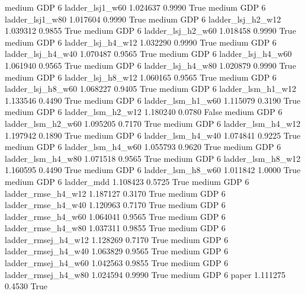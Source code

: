     medium      GDP                 6     ladder_lsj1_w60   1.024637      0.9990    True
    medium      GDP                 6     ladder_lsj1_w80   1.017604      0.9990    True
    medium      GDP                 6   ladder_lsj_h2_w12   1.039312      0.9855    True
    medium      GDP                 6   ladder_lsj_h2_w60   1.018458      0.9990    True
    medium      GDP                 6   ladder_lsj_h4_w12   1.032290      0.9990    True
    medium      GDP                 6   ladder_lsj_h4_w40   1.070487      0.9565    True
    medium      GDP                 6   ladder_lsj_h4_w60   1.061940      0.9565    True
    medium      GDP                 6   ladder_lsj_h4_w80   1.020879      0.9990    True
    medium      GDP                 6   ladder_lsj_h8_w12   1.060165      0.9565    True
    medium      GDP                 6   ladder_lsj_h8_w60   1.068227      0.9405    True
    medium      GDP                 6   ladder_lsm_h1_w12   1.133546      0.4490    True
    medium      GDP                 6   ladder_lsm_h1_w60   1.115079      0.3190    True
    medium      GDP                 6   ladder_lsm_h2_w12   1.180240      0.0780   False
    medium      GDP                 6   ladder_lsm_h2_w60   1.095205      0.7170    True
    medium      GDP                 6   ladder_lsm_h4_w12   1.197942      0.1890    True
    medium      GDP                 6   ladder_lsm_h4_w40   1.074841      0.9225    True
    medium      GDP                 6   ladder_lsm_h4_w60   1.055793      0.9620    True
    medium      GDP                 6   ladder_lsm_h4_w80   1.071518      0.9565    True
    medium      GDP                 6   ladder_lsm_h8_w12   1.160595      0.4490    True
    medium      GDP                 6   ladder_lsm_h8_w60   1.011842      1.0000    True
    medium      GDP                 6          ladder_mdd   1.108423      0.5725    True
    medium      GDP                 6  ladder_rmse_h4_w12   1.187127      0.3170    True
    medium      GDP                 6  ladder_rmse_h4_w40   1.120963      0.7170    True
    medium      GDP                 6  ladder_rmse_h4_w60   1.064041      0.9565    True
    medium      GDP                 6  ladder_rmse_h4_w80   1.037311      0.9855    True
    medium      GDP                 6 ladder_rmsej_h4_w12   1.128269      0.7170    True
    medium      GDP                 6 ladder_rmsej_h4_w40   1.063829      0.9565    True
    medium      GDP                 6 ladder_rmsej_h4_w60   1.042563      0.9855    True
    medium      GDP                 6 ladder_rmsej_h4_w80   1.024594      0.9990    True
    medium      GDP                 6               paper   1.111275      0.4530    True
